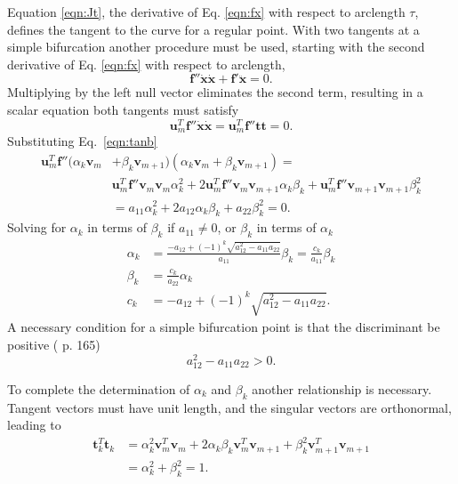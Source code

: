 \documentclass[10pt,openany,twoside]{book}
\numberwithin{equation}{section}   %
\newcommand{\Vector}[1]{\boldsymbol{#1}}
\newcommand{\Eqn}[1]{Eq.\ \ref{#1}}
\begin{document}
\par
Equation \ref{eqn:Jt}, the derivative of Eq. \ref{eqn:fx} with respect
to arclength $\tau$,
defines the tangent to the curve for a regular
point.
With two tangents at a simple bifurcation another procedure must
be used, starting with the
second derivative of Eq. \ref{eqn:fx}
with respect to arclength,
\begin{equation}
\Vector{f}''\dot{\Vector{x}}\dot{\Vector{x}} + \Vector{f}'\ddot{\Vector{x}} = 0.
\end{equation}
Multiplying
by the left null vector eliminates the second term,
resulting in a scalar equation both tangents must satisfy
\begin{equation}
\Vector{u}_m^T\Vector{f}''\dot{\Vector{x}}\dot{\Vector{x}} =
	\Vector{u}_m^T\Vector{f}''\Vector{t}\Vector{t} = 0.
\end{equation}
Substituting \Eqn{eqn:tanb}
\begin{align}
\Vector{u}_m^T\Vector{f}'' (\alpha_k\Vector{v}_m &+ \beta_k\Vector{v}_{m+1}) (\alpha_k\Vector{v}_m + \beta_k\Vector{v}_{m+1}) = \nonumber \\
 &     \Vector{u}_m^T\Vector{f}''\Vector{v}_m\Vector{v}_m \alpha_k^2 + 2\Vector{u}_m^T\Vector{f}''\Vector{v}_m\Vector{v}_{m+1}\alpha_k\beta_k + \Vector{u}_m^T\Vector{f}''\Vector{v}_{m+1}\Vector{v}_{m+1}\beta_k^2 \nonumber \\
    &= a_{11} \alpha_k^2 + 2a_{12}\alpha_k\beta_k + a_{22}\beta_k^2 = 0.
\end{align}
Solving for $\alpha_k$ in terms of $\beta_k$ if $a_{11} \ne 0$,
or $\beta_k$ in terms of $\alpha_k$
\begin{align}
\label{eqn:alpha}
 \alpha_k &= \frac{-a_{12} + (-1)^k\sqrt{a_{12}^2 - a_{11} a_{22}}}{a_{11}} \beta_k
 = \frac{c_k}{a_{11}} \beta_k  \nonumber \\
 \beta_k &= \frac{c_k}{a_{22}} \alpha_k \nonumber \\
 c_k &= -a_{12} + (-1)^k \sqrt{a_{12}^2 - a_{11} a_{22}}.
\end{align}
A necessary condition for a simple bifurcation point
is that the discriminant be positive (\cite{seydel1988equilibrium} p. 165)
\begin{equation*}
	a_{12}^2 - a_{11}a_{22} > 0.
\end{equation*}
\par
To complete the determination of $\alpha_k$ and $\beta_k$ another relationship is
necessary.
Tangent vectors must have unit length, and the singular vectors are
orthonormal, leading to
\begin{align*}
\Vector{t}_k^T\Vector{t}_k &= \alpha_k^2\Vector{v}_m^T\Vector{v}_m
	+ 2\alpha_k\beta_k\Vector{v}_m^T\Vector{v}_{m+1}
	+ \beta_k^2\Vector{v}_{m+1}^T\Vector{v}_{m+1} \nonumber \\
  &= \alpha_k^2 + \beta_k^2 = 1.
\end{align*}
\end{document}

